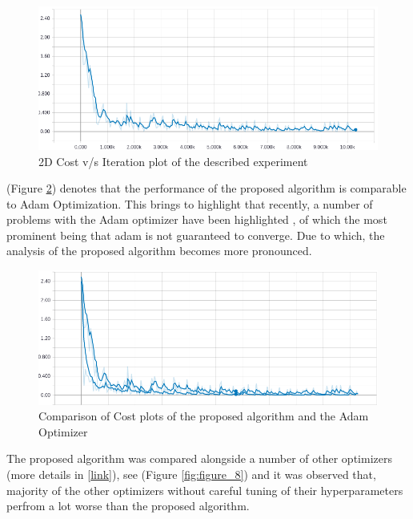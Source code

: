 \documentclass{article}
\begin{document}
\begin{figure}[h]
\begin{center}
\includegraphics[scale=1.2]{diagrams/ranik_xavier_paper.png}
\end{center}
\caption{2D Cost v/s Iteration plot of the described experiment}
\label{fig:figure_6}
\end{figure}

(Figure \ref{fig:figure_7}) denotes that the performance of the proposed algorithm is comparable to Adam Optimization. This brings to highlight that recently, a number of problems with the Adam optimizer have been highlighted \cite{anonymous:adam-problem}, of which the most prominent being that adam is not guaranteed to converge. Due to which, the analysis of the proposed algorithm becomes more pronounced.

\begin{figure}[h]
\begin{center}
\includegraphics[scale=1.2]{diagrams/ranik_vs_adam_paper.png}
\end{center}
\caption{Comparison of Cost plots of the proposed algorithm and the Adam Optimizer}
\label{fig:figure_7}
\end{figure}

The proposed algorithm was compared alongside a number of other optimizers (more details in [\url{link}]), see (Figure \ref{fig:figure_8}) and it was observed that, majority of the other optimizers without careful tuning of their hyperparameters perfrom a lot worse than the proposed algorithm.
\end{document}
